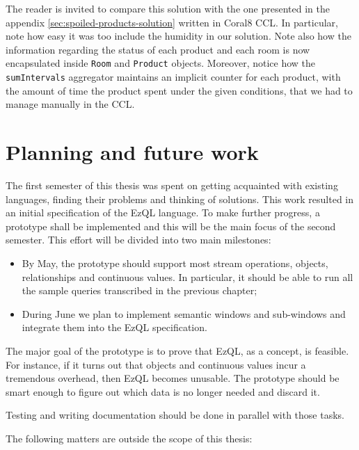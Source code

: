 \documentclass[a4,11pt]{report}
\begin{document}
The reader is invited to compare this solution with the one presented
in the appendix \ref{sec:spoiled-products-solution} written in Coral8
CCL. In particular, note how easy it was too include the humidity in
our solution. Note also how the information regarding the status of
each product and each room is now encapsulated inside \verb=Room= and
\verb=Product= objects. Moreover, notice how the \verb=sumIntervals=
aggregator maintains an implicit counter for each product, with the
amount of time the product spent under the given conditions, that we
had to manage manually in the CCL.

\chapter{Planning and future work}
\label{chap:future-work}

The first semester of this thesis was spent on getting acquainted with
existing languages, finding their problems and thinking of
solutions. This work resulted in an initial specification of the EzQL
language. To make further progress, a prototype shall be implemented
and this will be the main focus of the second semester. This effort
will be divided into two main milestones:

\begin{itemize}
\item By May, the prototype should support most stream operations,
  objects, relationships and continuous values. In particular, it
  should be able to run all the sample queries transcribed in the
  previous chapter;
\item During June we plan to implement semantic windows and
  sub-windows and integrate them into the EzQL specification.
\end{itemize}

The major goal of the prototype is to prove that EzQL, as a concept,
is feasible. For instance, if it turns out that objects and continuous
values incur a tremendous overhead, then EzQL becomes unusable. The
prototype should be smart enough to figure out which data is no longer
needed and discard it.

Testing and writing documentation should be done in parallel with
those tasks.

The following matters are outside the scope of this thesis:
\end{document}
